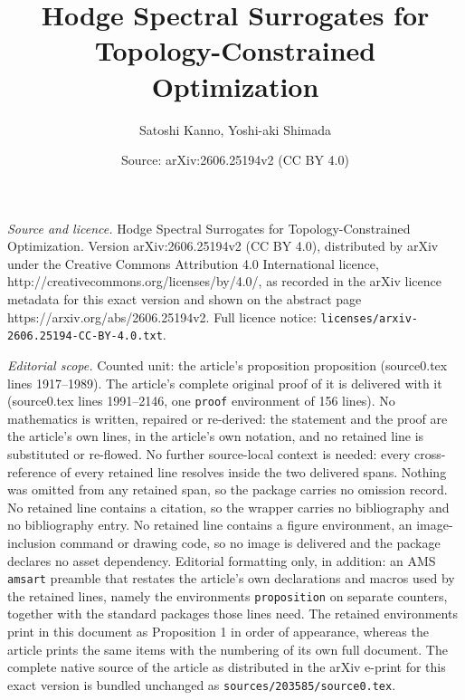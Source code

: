\documentclass[10pt,a4paper]{amsart}
\title{Hodge Spectral Surrogates for Topology-Constrained Optimization}
\author{Satoshi Kanno, Yoshi-aki Shimada}
\date{Source: arXiv:2606.25194v2 (CC BY 4.0)}
\begin{document}
\maketitle

\noindent\emph{Source and licence.} Hodge Spectral Surrogates for Topology-Constrained Optimization. Version arXiv:2606.25194v2 (CC BY 4.0), distributed by arXiv under the Creative Commons Attribution 4.0 International licence, http://creativecommons.org/licenses/by/4.0/, as recorded in the arXiv licence metadata for this exact version and shown on the abstract page https://arxiv.org/abs/2606.25194v2. Full licence notice: \texttt{licenses/arxiv-2606.25194-CC-BY-4.0.txt}.\par\smallskip

\noindent\textit{Editorial scope.} Counted unit: the article's proposition proposition (source0.tex lines 1917--1989). The article's complete original proof of it is delivered with it (source0.tex lines 1991--2146, one \texttt{proof} environment of 156 lines). No mathematics is written, repaired or re-derived: the statement and the proof are the article's own lines, in the article's own notation, and no retained line is substituted or re-flowed.  No further source-local context is needed: every cross-reference of every retained line resolves inside the two delivered spans.  Nothing was omitted from any retained span, so the package carries no omission record.  No retained line contains a citation, so the wrapper carries no bibliography and no bibliography entry.  No retained line contains a figure environment, an image-inclusion command or drawing code, so no image is delivered and the package declares no asset dependency.  Editorial formatting only, in addition: an AMS \texttt{amsart} preamble that restates the article's own declarations and macros used by the retained lines, namely the environments \texttt{proposition} on separate counters, together with the standard packages those lines need.  The retained environments print in this document as Proposition 1 in order of appearance, whereas the article prints the same items with the numbering of its own full document.  The complete native source of the article as distributed in the arXiv e-print for this exact version is bundled unchanged as \texttt{sources/203585/source0.tex}.
\end{document}
